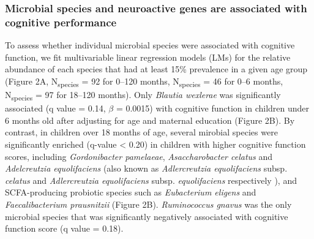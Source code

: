 \documentclass{article}
\begin{document}
\subsubsection*{Microbial species and neuroactive genes are associated with cognitive performance}

To assess whether individual microbial species were associated with
cognitive function, we fit multivariable linear regression models (LMs)
\cite{mallickMultivariableAssociationDiscovery2021}
for the relative abundance of each species that had at least 15\%
prevalence in a given age group (Figure 2A, N\textsubscript{species} = 92 for 0--120 months, 
N\textsubscript{species} = 46 for 0--6 months, N\textsubscript{species} = 97 for 18--120 months).
Only \emph{Blautia wexlerae} was significantly associated (q value = 0.14, $\beta$ = 0.0015) with
cognitive function in children under 6 months old after adjusting for
age and maternal education (Figure 2B).
By contrast, in children over 18 months of age,
several mirobial species were significantly enriched (q-value
\textless{} 0.20) in children with higher cognitive function scores,
including \emph{Gordonibacter pamelaeae},
\emph{Asaccharobacter celatus} and \emph{Adelcreutzia equolifaciens}
(also known as \textit{Adlercreutzia equolifaciens} subsp. \textit{celatus}
and \textit{Adlercreutzia equolifaciens} subsp. \textit{equolifaciens} respectively
\cite{maruoAdlercreutziaEquolifaciensGen2008}),
and SCFA-producing probiotic
species such as \emph{Eubacterium eligens} and \emph{Faecalibacterium
prausnitzii}
\cite{ghoshMediterraneanDietIntervention2020}
(Figure 2B). \textit{Ruminococcus gnavus} was the only microbial species
that was significantly negatively associated with cognitive function score (q value = 0.18).
\end{document}
